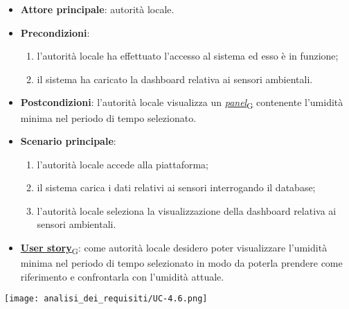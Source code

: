 \begin{itemize}
	\item \textbf{Attore principale}: autorità locale.
	\item \textbf{Precondizioni}:
	      \begin{enumerate}
		      \item l'autorità locale ha effettuato l'accesso al sistema ed esso è in funzione;
		      \item il sistema ha caricato la dashboard relativa ai sensori ambientali.
	      \end{enumerate}
	\item \textbf{Postcondizioni}: l'autorità locale visualizza un \href{https://7last.github.io/docs/rtb/documentazione-interna/glossario\#panel}{\textit{panel}\textsubscript{G}} contenente l'umidità minima nel periodo di tempo selezionato.
	\item \textbf{Scenario principale}:
	      \begin{enumerate}
		      \item l'autorità locale accede alla piattaforma;
		      \item il sistema carica i dati relativi ai sensori interrogando il database;
		      \item l'autorità locale seleziona la visualizzazione della dashboard relativa ai sensori ambientali.
	      \end{enumerate}
	\item \href{https://7last.github.io/docs/rtb/documentazione-interna/glossario\#user-story}{\textbf{User story}\textsubscript{G}}:
	      come autorità locale desidero poter visualizzare l'umidità minima nel periodo di tempo selezionato
	      in modo da poterla prendere come riferimento e confrontarla con l'umidità attuale.
\end{itemize}
\begin{center}
	\texttt{[image: analisi\_dei\_requisiti/UC-4.6.png]}
\end{center}


